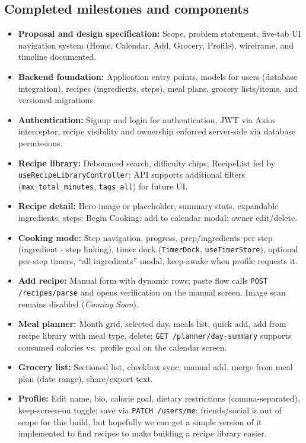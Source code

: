 \documentclass[conference]{IEEEtran}
\begin{document}
\subsection{Completed milestones and components}
\begin{itemize}[leftmargin=*]
  \item \textbf{Proposal and design specification:} Scope, problem statement, five-tab UI navigation system (Home, Calendar, Add, Grocery, Profile), wireframe, and timeline documented.
  \item \textbf{Backend foundation:} Application entry points, models for users (database integration), recipes (ingredients, steps), meal plans, grocery lists/items, and versioned migrations.
  \item \textbf{Authentication:} Signup and login for authentication, JWT via Axios interceptor,  recipe visibility and ownership enforced server-side via database permissions.
  \item \textbf{Recipe library:} Debounced search, difficulty chips, RecipeList fed by \texttt{useRecipeLibraryController}; API supports additional filters (\texttt{max\_total\_minutes}, \texttt{tags\_all}) for future UI.
  \item \textbf{Recipe detail:} Hero image or placeholder, summary stats, expandable ingredients, steps; Begin Cooking; add to calendar modal; owner edit/delete.
  \item \textbf{Cooking mode:} Step navigation, progress, prep/ingredients per step (ingredient - step linking), timer dock (\texttt{TimerDock}, \texttt{useTimerStore}), optional per-step timers, ``all ingredients'' modal, keep-awake when profile requests it.
  \item \textbf{Add recipe:} Manual form with dynamic rows; paste flow calls \texttt{POST /recipes/parse} and opens verification on the manual screen. Image scan remains disabled (\emph{Coming Soon}).
  \item \textbf{Meal planner:} Month grid, selected day, meals list, quick add, add from recipe library with meal type, delete; \texttt{GET /planner/day-summary} supports consumed calories vs.\ profile goal on the calendar screen.
  \item \textbf{Grocery list:} Sectioned list, checkbox sync, manual add, merge from meal plan (date range), share/export text.
  \item \textbf{Profile:} Edit name, bio, calorie goal, dietary restrictions (comma-separated), keep-screen-on toggle; save via \texttt{PATCH /users/me}; friends/social is out of scope for this build, but hopefully we can get a simple version of it implemented to find recipes to make building a recipe library easier.
\end{itemize}
\end{document}
